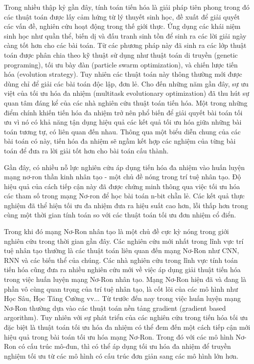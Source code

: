 Trong nhiều thập kỷ gần đây, tính toán tiến hóa là giải pháp tiên phong trong đó các thuật toán được lấy cảm hứng từ lý thuyết sinh học, đề xuất để giải quyết các vấn đề, nghiên cứu hoạt động trong thế giới thực. Ứng dụng các khái niệm sinh học như quần thể, biến dị và đấu tranh sinh tồn để sinh ra các lời giải ngày càng tốt hơn cho các bài toán. Từ các phương pháp này đã sinh ra các lớp thuật toán được phân chia theo kỹ thuật sử dụng như thuật toán di truyền (genetic programing), tối ưu bày đàn (particle swarm optimization), và chiến lược tiến hóa (evolution strategy). Tuy nhiên các thuật toán này thông thường mới được dùng chỉ để giải các bài toán độc lập, đơn lẻ. Cho đến những năm gần đây, sự ưu việt của tối ưu hóa đa nhiệm (multitask evolutionary optimization) đã thu hút sự quan tâm đáng kể của các nhà nghiên cứu thuật toán tiến hóa. Một trong những điểm chính khiến tiến hóa đa nhiệm trở nên phổ biến để giải quyết bài toán tối ưu vì nó có khả năng tận dụng hiệu quả các kết quả tối ưu hóa giữa những bài toán tương tự, có liên quan đến nhau. Thông qua một biểu diễn chung của các bài toán có này, tiến hóa đa nhiệm sẽ ngầm kết hợp các nghiệm của từng bài toán để đưa ra lời giải tốt hơn cho bài toán cấu thành. 

Gần đây, có nhiều nỗ lực nghiên cứu áp dụng tiến hóa đa nhiệm vào huấn luyện mạng nơ-ron thần kinh
nhân tạo - một chủ đề nóng trong trí tuệ nhân tạo. Độ hiệu quả của cách tiếp cận này đã được chứng minh thông qua việc tối ưu hóa các tham số trong mạng Nơ-ron để học bài toán n-bit chẵn lẻ. Các kết quả thực nghiệm đã thể hiện tối ưu đa nhiệm đưa ra hiệu suất cao hơn, lỗi thấp hơn trong cùng một thời gian tính toán so với các thuật toán tối ưu đơn nhiệm cổ điển. 

Trong khi đó mạng Nơ-Ron nhân tạo là một chủ đề cực kỳ nóng trong giới nghiên cứu trong thời gian gần đây. Các nghiên cứu mới nhất trong lĩnh vực trí tuệ nhân tạo thường là các thuật toán liên quan đến mạng Nơ-Ron như CNN, RNN và các biến thể của chúng. Các nhà nghiên cứu trong lĩnh vực tính toán tiến hóa cũng đưa ra nhiều nghiên cứu mới về việc áp dụng giải thuật tiến hóa trong việc huấn luyện mạng Nơ-Ron nhân tạo. Mạng Nơ-Ron hiện đã và đang là phần vô cùng quan trọng của trí tuệ nhân tạo, là cốt lõi của các mô hình như Học Sâu, Học Tăng Cường vv... Từ trước đến nay trong việc huấn luyện mạng Nơ-Ron thường dựa vào các thuật toán nền tảng gradient (gradient based argorithm). Tuy nhiên với sự phát triển của các nghiên cứu trong tiến hóa tối ưu đặc biệt là thuật toán tối ưu hóa đa nhiệm có thể đem đến một cách tiếp cận mới hiệu quả trong bài toán tối ưu hóa mạng Nơ-Ron. Trong đó với các mô hình Nơ-Ron có cấu trúc mô-đun, thì có thể áp dụng tối ưu hóa đa nhiệm để truyền nghiệm tối ưu từ các mô hình có cấu trúc đơn giản sang các mô hình lớn hơn.

